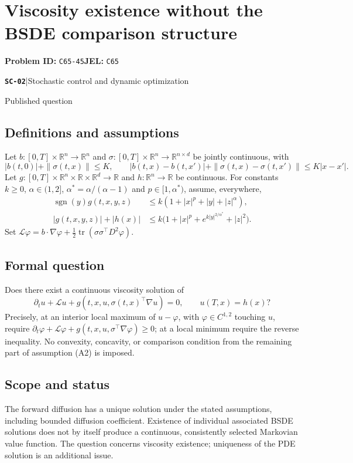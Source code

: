 \documentclass[11pt,a4paper]{article}
\newcommand{\R}{\mathbb R}
\newcommand{\entrymeta}[3]{{\sffamily\small\color{muted}\textbf{\texttt{#1}}\quad|\quad #2\par #3\par}}
\begin{document}
\section*{Viscosity existence without the BSDE comparison structure}
\textbf{Problem ID:} \texttt{C65-45}\quad \textbf{JEL:} \texttt{C65}\par
\label{problem:OP-0563}
\label{beyond:SC-02}
\entrymeta{SC-02}{Stochastic control and dynamic optimization}{Published question}
\subsection*{Definitions and assumptions}
Let $b:[0,T]\times\R^n\to\R^n$ and
$\sigma:[0,T]\times\R^n\to\R^{n\times d}$ be jointly continuous, with
\[
 |b(t,0)|+\|\sigma(t,x)\|\leq K,\qquad
 |b(t,x)-b(t,x')|+\|\sigma(t,x)-\sigma(t,x')\|\leq K|x-x'|.
\]
Let $g:[0,T]\times\R^n\times\R\times\R^d\to\R$ and
$h:\R^n\to\R$ be continuous. For constants $k\geq0$,
$\alpha\in(1,2]$, $\alpha^*=\alpha/(\alpha-1)$ and
$p\in[1,\alpha^*)$, assume, everywhere,
\begin{align*}
 \operatorname{sgn}(y)g(t,x,y,z)&\leq k(1+|x|^p+|y|+|z|^\alpha),\\
 |g(t,x,y,z)|+|h(x)|&\leq
 k\bigl(1+|x|^p+e^{k|y|^{2/\alpha^*}}+|z|^2\bigr).
\end{align*}
Set $\mathcal L\varphi=b\cdot\nabla\varphi+
\frac12\operatorname{tr}(\sigma\sigma^\top D^2\varphi)$.
\subsection*{Formal question}
Does there exist a continuous viscosity solution of
\[
 \partial_tu+\mathcal Lu+
 g(t,x,u,\sigma(t,x)^\top\nabla u)=0,
 \qquad u(T,x)=h(x)?
\]
Precisely, at an interior local maximum of $u-\varphi$, with
$\varphi\in C^{1,2}$ touching $u$, require
$\partial_t\varphi+\mathcal L\varphi+
g(t,x,u,\sigma^\top\nabla\varphi)\geq0$; at a local minimum require
the reverse inequality. No convexity, concavity, or comparison condition
from the remaining part of assumption (A2) is imposed.
\subsection*{Scope and status}
The forward diffusion has a unique solution under the stated assumptions,
including bounded diffusion coefficient. Existence of individual associated
BSDE solutions does not by itself produce a continuous, consistently
selected Markovian value function. The question concerns viscosity
existence; uniqueness of the PDE solution is an additional issue.
\end{document}
